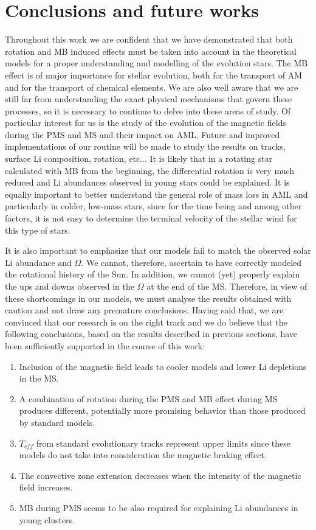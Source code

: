 \documentclass[fleqn,usenatbib]{mnras}
\begin{document}
\section{Conclusions and future works}
Throughout this work we are confident that we have demonstrated that both rotation and MB induced effects must be taken into account in the theoretical models for a proper understanding and modelling of the evolution stars. The MB effect is of major importance for stellar evolution, both for the transport of AM and for the transport of chemical elements. We are also well aware that we are still far from understanding the exact physical mechanisms that govern these processes, so it is necessary to continue to delve into these areas of study. Of particular interest for us is the study of the evolution of the magnetic fields during the PMS and MS and their impact on AML. Future and improved implementations of our routine will be made to study the results on tracks, surface Li composition, rotation, etc... It is likely that in a rotating star calculated with MB from the beginning, the differential rotation is very much reduced and Li abundances observed in young stars could be explained. It is equally important to better understand the general role of mass loss in AML and particularly in colder, low-mass stars, since for the time being and among other factors, it is not easy to determine the terminal velocity of the stellar wind for this type of stars.\par

It is also important to emphasize that our models fail to match the observed solar Li abundance and $\Omega$. We cannot, therefore, ascertain to have correctly modeled the rotational history of the Sun. In addition, we cannot (yet) properly explain the ups and downs observed in the $\Omega$ at the end of the MS. Therefore, in view of these shortcomings in our models, we must analyse the results obtained with caution and not draw any premature conclusions. Having said that, we are convinced that our research is on the right track and we do believe that the following conclusions, based on the results described in previous sections, have been sufficiently supported in the course of this work:
\begin{enumerate}
    \item Inclusion of the magnetic field leads to cooler models and lower Li depletions in the MS.
    \item A combination of rotation during the PMS and MB effect during MS produces different, potentially more promising behavior than those produced by standard models.
    \item $T_{eff}$ from standard evolutionary tracks represent upper limits since these models do not take into consideration the magnetic braking effect.
    \item The convective zone extension decreases when the intensity of the magnetic field increases.
    \item MB during PMS seems to be also required for explaining Li abundances in young clusters.
\end{enumerate}
\end{document}
